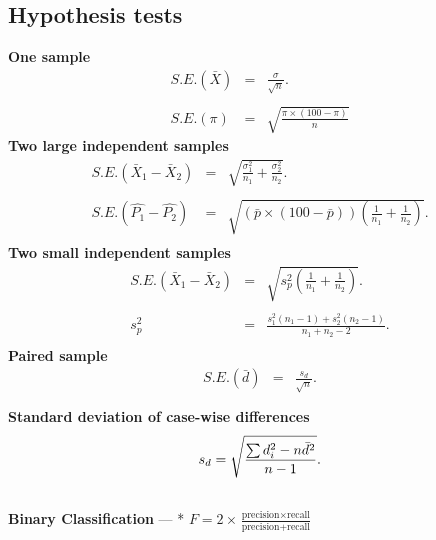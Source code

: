 \subsection*{Hypothesis tests}
{\bf One sample}
\begin{eqnarray*}
S.E.(\bar{X})&=&\frac{\sigma}{\sqrt{n}}.\\\\
S.E.(\pi)&=&\sqrt{\frac{\pi\times(100-\pi)}{n}}
\end{eqnarray*}
{\bf Two large independent samples}
\begin{eqnarray*}
S.E.(\bar{X}_1-\bar{X}_2)&=&\sqrt{\frac{\sigma^2_1}{n_1}+\frac{\sigma_2^2}{n_2}}.\\\\
S.E.(\hat{P_1}-\hat{P_2})&=&\sqrt{\left(\bar{p}\times(100-\bar{p})\right)\left(\frac{1}{n_1}+\frac{1}{n_2}\right)}.\\
\end{eqnarray*}
{\bf Two small independent samples}
\begin{eqnarray*}
S.E.(\bar{X}_1-\bar{X}_2)&=&\sqrt{s_p^2\left(\frac{1}{n_1}+\frac{1}{n_2}\right)}.\\\\
s_p^2&=&\frac{s_1^2(n_1-1)+s_2^2(n_2-1)}{n_1+n_2-2}.\\
\end{eqnarray*}
{\bf Paired sample}
\begin{eqnarray*}
S.E.(\bar{d})&=&\frac{s_d}{\sqrt{n}}.\\\\
\end{eqnarray*}
{\bf Standard deviation of case-wise differences}
\begin{eqnarray*}
s_d = \sqrt{ {\sum d_i^2 - n\bar{d}^2 \over n-1}}.\\\\
\end{eqnarray*}
{\bf Binary Classification}
--- 
* $F = 2 \times \frac{\mbox{precision} \times \mbox{recall}}{ \mbox{precision} + \mbox{recall}}$




